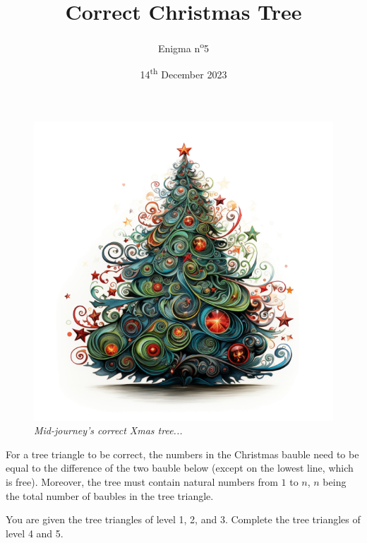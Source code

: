\documentclass[a4paper, top=10mm]{article}
\title{\textbf{\huge{Correct Christmas Tree}}}
\author{Enigma n\textsuperscript{o}5}
\date{14\textsuperscript{th} December 2023}
\begin{document}
	\maketitle
	
	\begin{figure}
		\vspace{-2.5cm}
		\hspace{-0.75cm}
		\includegraphics[width=1.3\linewidth]{05_xmas_tree.png}
		\textit{Mid-journey's correct Xmas tree...}
	\end{figure}
	
	For a tree triangle to be correct, the numbers in the Christmas bauble need to be equal to the difference of the two bauble below (except on the lowest line, which is free).
	Moreover, the tree must contain natural numbers from $1$ to $n$, $n$ being the total number of baubles in the tree triangle.
	
	You are given the tree triangles of level 1, 2, and 3.
	Complete the tree triangles of level 4 and 5.
	
\end{document}
